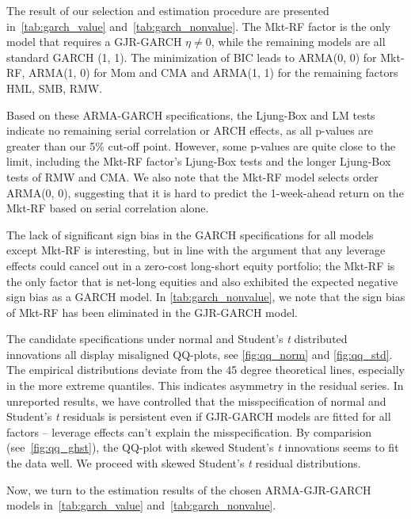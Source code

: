 The result of our selection and estimation procedure are presented in~\autoref{tab:garch_value} and~\autoref{tab:garch_nonvalue}. The Mkt-RF factor is the only model that requires a GJR-GARCH $\eta \neq 0$, while the remaining models are all standard GARCH (1, 1). The minimization of BIC leads to ARMA(0, 0) for Mkt-RF, ARMA(1, 0) for Mom and CMA and ARMA(1, 1) for the remaining factors HML, SMB, RMW. 

Based on these ARMA-GARCH specifications, the Ljung-Box and LM tests indicate no remaining serial correlation or ARCH effects, as all p-values are greater than our 5\% cut-off point. However, some p-values are quite close to the limit, including the Mkt-RF factor's Ljung-Box tests and the longer Ljung-Box tests of RMW and CMA. We also note that the Mkt-RF model selects order ARMA(0, 0), suggesting that it is hard to predict the 1-week-ahead return on the Mkt-RF based on serial correlation alone.

The lack of significant sign bias in the GARCH specifications for all models except Mkt-RF is interesting, but in line with the argument that any leverage effects could cancel out in a zero-cost long-short equity portfolio; the Mkt-RF is the only factor that is net-long equities and also exhibited the expected negative sign bias as a GARCH model. In \autoref{tab:garch_nonvalue}, we note that the sign bias of Mkt-RF has been eliminated in the GJR-GARCH model. 

The candidate specifications under normal and Student's \textit{t} distributed innovations all display misaligned QQ-plots, see \autoref{fig:qq_norm} and \autoref{fig:qq_std}. The empirical distributions deviate from the 45 degree theoretical lines, especially in the more extreme quantiles. This indicates asymmetry in the residual series. In unreported results, we have controlled that the misspecification of normal and Student's \textit{t} residuals is persistent even if GJR-GARCH models are fitted for all factors -- leverage effects can't explain the misspecification. By comparision (see~\autoref{fig:qq_ghst}), the QQ-plot with skewed Student's \textit{t} innovations seems to fit the data well. We proceed with skewed Student's \textit{t} residual distributions.

Now, we turn to the estimation results of the chosen ARMA-GJR-GARCH models in~\autoref{tab:garch_value} and~\autoref{tab:garch_nonvalue}. 

